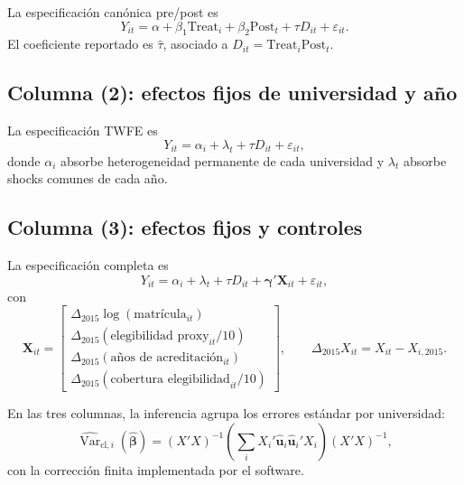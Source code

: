 \documentclass[11pt]{article}
\newcommand{\Treat}{\mathrm{Treat}}
\newcommand{\Post}{\mathrm{Post}}
\newcommand{\Var}{\operatorname{Var}}
\begin{document}
La especificación canónica pre/post es
\begin{equation}
 Y_{it}=\alpha+\beta_1\Treat_i+\beta_2\Post_t
       +\tau D_{it}+\varepsilon_{it}.
 \label{eq:basic-did}
\end{equation}
El coeficiente reportado es $\widehat\tau$, asociado a
$D_{it}=\Treat_i\Post_t$.

\subsection{Columna (2): efectos fijos de universidad y año}

La especificación TWFE es
\begin{equation}
 Y_{it}=\alpha_i+\lambda_t+\tau D_{it}+\varepsilon_{it},
 \label{eq:twfe}
\end{equation}
donde $\alpha_i$ absorbe heterogeneidad permanente de cada universidad y
$\lambda_t$ absorbe shocks comunes de cada año.

\subsection{Columna (3): efectos fijos y controles}

La especificación completa es
\begin{equation}
 Y_{it}=\alpha_i+\lambda_t+\tau D_{it}
       +\boldsymbol\gamma'\mathbf X_{it}+\varepsilon_{it},
 \label{eq:twfe-controls}
\end{equation}
con
\begin{equation}
 \mathbf X_{it}=
 \begin{bmatrix}
  \Delta_{2015}\log(\text{matrícula}_{it}) \\
  \Delta_{2015}(\text{elegibilidad proxy}_{it}/10) \\
  \Delta_{2015}(\text{años de acreditación}_{it}) \\
  \Delta_{2015}(\text{cobertura elegibilidad}_{it}/10)
 \end{bmatrix},
 \qquad
 \Delta_{2015}X_{it}=X_{it}-X_{i,2015}.
\end{equation}

En las tres columnas, la inferencia agrupa los errores estándar por universidad:
\begin{equation}
 \widehat{\Var}_{\mathrm{cl},i}(\widehat{\boldsymbol\beta})
 =(X'X)^{-1}
 \left(\sum_i X_i'\widehat{\mathbf u}_i
              \widehat{\mathbf u}_i'X_i\right)
 (X'X)^{-1},
\end{equation}
con la corrección finita implementada por el software.
\end{document}
